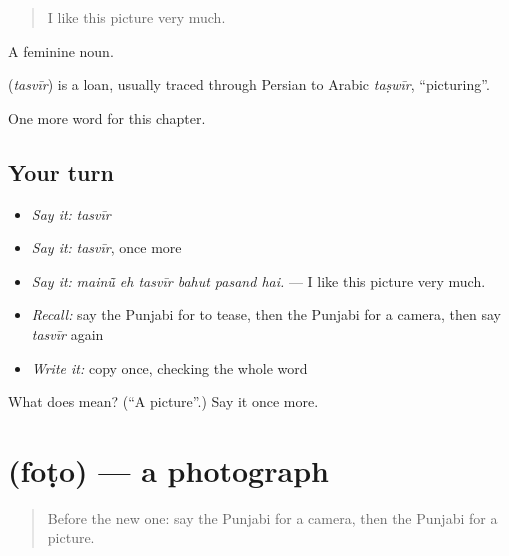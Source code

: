 \begin{quote}
I like this picture very much.
\end{quote}

A feminine noun.

\begin{cousinweb}
\textbf{} (\emph{tasvīr}) is a loan, usually traced through Persian to Arabic \emph{taṣwīr}, \textquotedblleft{}picturing\textquotedblright{}.
\end{cousinweb}

\begin{grammarlens}[title={What you've built}]
One more word for this chapter.
\end{grammarlens}

\subsection*{Your turn}
\begin{itemize}
\raggedright
  \item \emph{Say it:} \emph{tasvīr}
  \item \emph{Say it:} \emph{tasvīr}, once more
  \item \emph{Say it:} \emph{mainū̃ eh tasvīr bahut pasand hai.} — I like this picture very much.
  \item \emph{Recall:} say the Punjabi for to tease, then the Punjabi for a camera, then say \emph{tasvīr} again
  \item \emph{Write it:} copy \textbf{} once, checking the whole word
\end{itemize}

\begin{tcolorbox}[breakable,colback=teal!4,colframe=teal!35!black,title={Before you move on}]
What does  mean? (\textquotedblleft{}A picture\textquotedblright{}.) Say it once more.
\end{tcolorbox}
\section[\texorpdfstring{\pa{ਫ਼ੋਟੋ} (foṭo)}{ਫ਼ੋਟੋ (foṭo)}]{ (foṭo) — a photograph}

\label{lesson:PA-C356-foto}



\begin{quote}
Before the new one: say the Punjabi for a camera, then the Punjabi for a picture.
\end{quote}

